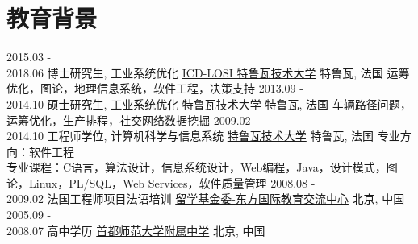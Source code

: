 \documentclass[letterpaper]{twentysecondcv} %
\begin{document}
\makeprofile %


\vspace{-0.2cm}
\section{教育背景}

\begin{twenty}
	\twentyitem
    	{2015.03 - \\ 2018.06}
        {博士研究生, 工业系统优化}
        {\href{http://losi.utt.fr/en/index.html}{ICD-LOSI 特鲁瓦技术大学}}
        {特鲁瓦, 法国}
        {\textbullet{} 运筹优化，图论，地理信息系统，软件工程，决策支持}
	\twentyitem
    	{2013.09 - \\ 2014.10}
        {硕士研究生, 工业系统优化}
        {\href{http://www.utt.fr/en/index.html}{特鲁瓦技术大学}}
        {特鲁瓦, 法国}
        {\textbullet{} 车辆路径问题，运筹优化，生产排程，社交网络数据挖掘}
    \twentyitem
    	{2009.02 - \\ 2014.10}
        {工程师学位, 计算机科学与信息系统}
        {\href{http://www.utt.fr/en/index.html}{特鲁瓦技术大学}}
        {特鲁瓦, 法国}
        {\textbullet{} 专业方向：软件工程 \\
        \textbullet{} 专业课程：C语言，算法设计，信息系统设计，Web编程，Java，设计模式，图论，Linux，PL/SQL，Web Services，软件质量管理\vspace{0.3cm}}
    \twentyitem
        {2008.08 - \\ 2009.02}
        {法国工程师项目法语培训}
        {\href{http://www.cscdf.org/}{留学基金委-东方国际教育交流中心}}
        {北京, 中国}
        {\vspace{-0.3cm}}
    \twentyitem
        {2005.09 - \\ 2008.07}
        {高中学历}
        {\href{https://baike.baidu.com/item/首都师范大学附属中学}{首都师范大学附属中学}}
        {北京, 中国}
        {\vspace{-0.6cm}}
\end{twenty}
\end{document}
